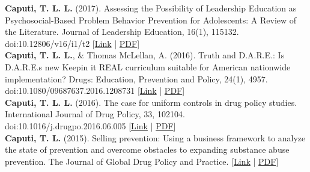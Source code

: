 \textbf{\textbf{Caputi, T. L.} L.} (2017). Assessing the Possibility of Leadership Education as Psychosocial-Based Problem Behavior Prevention for Adolescents: A Review of the Literature. Journal of Leadership Education, 16(1), 115132. doi:10.12806/v16/i1/t2 [\href{https://journalofleadershiped.org/wp-content/uploads/2019/02/16_1_caputi.pdf}{Link} | \href{https://www.theodorecaputi.com/files/JOLE-2017.pdf}{PDF}] \\[.2cm]
\textbf{\textbf{Caputi, T. L.} L.}, & Thomas McLellan, A. (2016). Truth and D.A.R.E.: Is D.A.R.E.s new Keepin it REAL curriculum suitable for American nationwide implementation? Drugs: Education, Prevention and Policy, 24(1), 4957. doi:10.1080/09687637.2016.1208731 [\href{https://www.tandfonline.com/doi/full/10.1080/09687637.2016.1208731}{Link} | \href{https://www.theodorecaputi.com/files/DEPP-2016.pdf}{PDF}] \\[.2cm]
\textbf{\textbf{Caputi, T. L.} L.} (2016). The case for uniform controls in drug policy studies. International Journal of Drug Policy, 33, 102104. doi:10.1016/j.drugpo.2016.06.005 [\href{https://www.sciencedirect.com/science/article/abs/pii/S095539591630175X}{Link} | \href{https://www.theodorecaputi.com/files/IJDP-2016.pdf}{PDF}] \\[.2cm]
\textbf{Caputi, T. L.} (2015). Selling prevention: Using a business framework to analyze the state of prevention and overcome obstacles to expanding substance abuse prevention. The Journal of Global Drug Policy and Practice. [\href{https://www.dfaf.org/wp-content/uploads/2018/11/Vol-9-Issue-1.pdf}{Link} | \href{https://www.theodorecaputi.com/files/JGDPP-2015.pdf}{PDF}] \\[.2cm]

